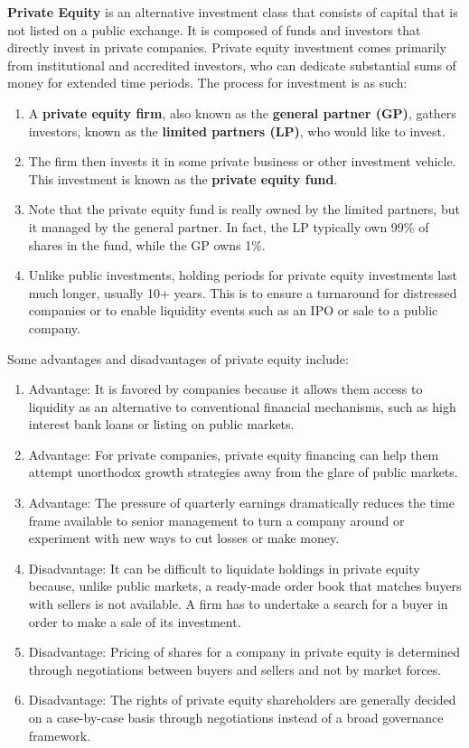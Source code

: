 \documentclass{article}
\begin{document}
    \begin{definition}
      \textbf{Private Equity} is an alternative investment class that consists of capital that is not listed on a public exchange. It is composed of funds and investors that directly invest in private companies. Private equity investment comes primarily from institutional and accredited investors, who can dedicate substantial sums of money for extended time periods. The process for investment is as such: 
      \begin{enumerate}
        \item A \textbf{private equity firm}, also known as the \textbf{general partner (GP)}, gathers investors, known as the \textbf{limited partners (LP)}, who would like to invest. 
        \item The firm then invests it in some private business or other investment vehicle. This investment is known as the \textbf{private equity fund}. 
        \item Note that the private equity fund is really owned by the limited partners, but it managed by the general partner. In fact, the LP typically own 99\% of shares in the fund, while the GP owns 1\%. 
        \item Unlike public investments, holding periods for private equity investments last much longer, usually 10+ years. This is to ensure a turnaround for distressed companies or to enable liquidity events such as an IPO or sale to a public company.  
      \end{enumerate}
      Some advantages and disadvantages of private equity include: 
      \begin{enumerate}
        \item Advantage: It is favored by companies because it allows them access to liquidity as an alternative to conventional financial mechanisms, such as high interest bank loans or listing on public markets. 
        \item Advantage: For private companies, private equity financing can help them attempt unorthodox growth strategies away from the glare of public markets. 
        \item Advantage: The pressure of quarterly earnings dramatically reduces the time frame available to senior management to turn a company around or experiment with new ways to cut losses or make money. 
        \item Disadvantage: It can be difficult to liquidate holdings in private equity because, unlike public markets, a ready-made order book that matches buyers with sellers is not available. A firm has to undertake a search for a buyer in order to make a sale of its investment. 
        \item Disadvantage: Pricing of shares for a company in private equity is determined through negotiations between buyers and sellers and not by market forces. 
        \item Disadvantage: The rights of private equity shareholders are generally decided on a case-by-case basis through negotiations instead of a broad governance framework. 
      \end{enumerate}
    \end{definition}
\end{document}
